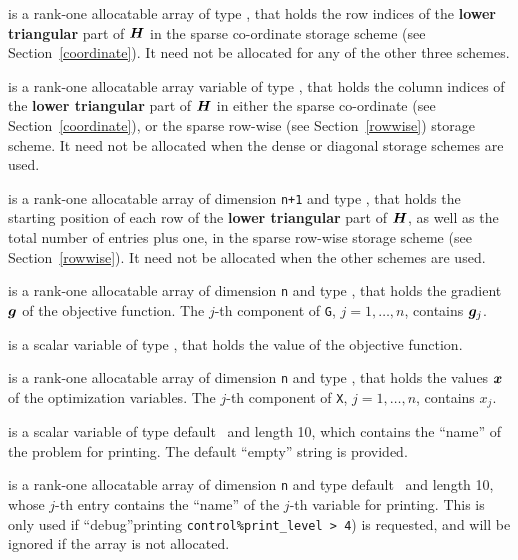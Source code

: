 \documentclass{galahad}
\begin{document}
\begin{description}
\begin{description}
 is a rank-one allocatable array of type \integer,
that holds the row indices of the {\bf lower triangular} part of ${\bm{H}}$
in the sparse co-ordinate storage
scheme (see Section~\ref{coordinate}).
It need not be allocated for any of the other three schemes.

 is a rank-one allocatable array variable of type \integer,
that holds the column indices of the {\bf lower triangular} part of
${\bm{H}}$ in either the sparse co-ordinate
(see Section~\ref{coordinate}), or the sparse row-wise
(see Section~\ref{rowwise}) storage scheme.
It need not be allocated when the dense or diagonal storage schemes are used.

 is a rank-one allocatable array of dimension {\tt n+1} and type
\integer, that holds the starting position of
each row of the {\bf lower triangular} part of ${\bm{H}}$, as well
as the total number of entries plus one, in the sparse row-wise storage
scheme (see Section~\ref{rowwise}). It need not be allocated when the
other schemes are used.

\end{description}

 is a rank-one allocatable array of dimension {\tt n} and type
\realdp, that holds the gradient ${\bm{g}}$
of the objective function.
The $j$-th component of
{\tt G}, $j = 1,  \ldots ,  n$, contains ${\bm{g}}_{j}$.

 is a scalar variable of type
\realdp, that holds the value of the objective function.

 is a rank-one allocatable array of dimension {\tt n} and type
\realdp,
that holds the values ${\bm{x}}$ of the optimization variables.
The $j$-th component of {\tt X}, $j = 1,  \ldots , n$, contains $x_{j}$.

 is a scalar variable of type
default \character\ and length 10, which contains the
``name'' of the problem for printing. The default ``empty'' string is
provided.

 is a rank-one allocatable array of dimension {\tt n} and type
default \character\ and length 10, whose $j$-th entry contains the
``name'' of the $j$-th variable for printing. This is only used
if ``debug''printing {\tt control\%print\_level > 4}) is requested,
and will be ignored if the array is not allocated.

\end{description}

\end{document}
